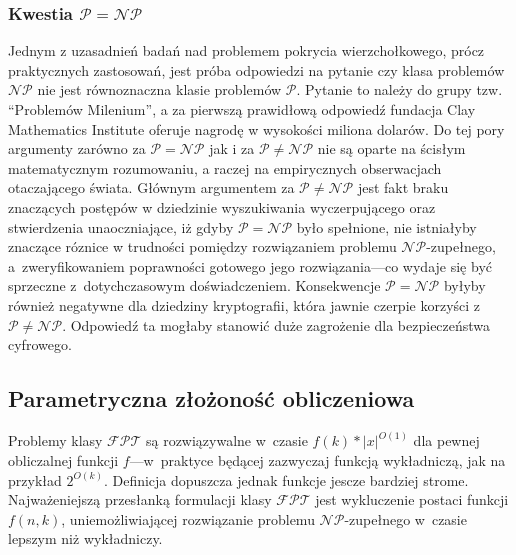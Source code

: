\subsubsection{Kwestia $\mathcal{P}=\mathcal{NP}$}
\label{sss_problem_p_neq_np}
\par{
  Jednym z uzasadnień badań nad problemem pokrycia wierzchołkowego, prócz
  praktycznych zastosowań, jest próba odpowiedzi na pytanie czy klasa problemów
  $\mathcal{NP}$ nie jest równoznaczna klasie problemów $\mathcal{P}$.
  Pytanie to należy do grupy tzw. ``Problemów Milenium'', a za pierwszą
  prawidłową odpowiedź fundacja Clay Mathematics Institute oferuje nagrodę w
  wysokości miliona dolarów. 
  Do tej pory argumenty zarówno za $\mathcal{P}=\mathcal{NP}$ jak i za
  $\mathcal{P}\neq\mathcal{NP}$ nie są oparte na ścisłym matematycznym
  rozumowaniu, a raczej na empirycznych obserwacjach otaczającego świata.
  Głównym argumentem za $\mathcal{P}\neq\mathcal{NP}$ jest fakt braku znaczących
  postępów w dziedzinie wyszukiwania wyczerpującego oraz stwierdzenia
  unaoczniające, iż gdyby $\mathcal{P}=\mathcal{NP}$ było spełnione, nie 
  istniałyby znaczące róznice w trudności pomiędzy rozwiązaniem 
  problemu $\mathcal{NP}$-zupełnego, a~zweryfikowaniem poprawności gotowego 
  jego rozwiązania---co wydaje się być sprzeczne z~dotychczasowym doświadczeniem.
  Konsekwencje $\mathcal{P}=\mathcal{NP}$ byłyby również negatywne dla dziedziny
  kryptografii, która jawnie czerpie korzyści z $\mathcal{P}\neq\mathcal{NP}$.
  Odpowiedź ta mogłaby stanowić duże zagrożenie dla bezpieczeństwa cyfrowego.
}

\subsection{Parametryczna złożoność obliczeniowa}
\label{sss_parametric_complexity}
\par{
  Problemy klasy $\mathcal{FPT}$ są rozwiązywalne w~czasie $f(k)*|x|^{O(1)}$ dla
  pewnej obliczalnej funkcji $f$---w~praktyce będącej zazwyczaj funkcją 
  wykładniczą, jak na przykład $2^{O(k)}$.
  Definicja dopuszcza jednak funkcje jescze bardziej strome.
  Najważeniejszą przesłanką formulacji klasy $\mathcal{FPT}$ jest wykluczenie
  postaci funkcji $f(n,k)$, uniemożliwiającej rozwiązanie problemu 
  $\mathcal{NP}$-zupełnego w~czasie lepszym niż wykładniczy.
}

